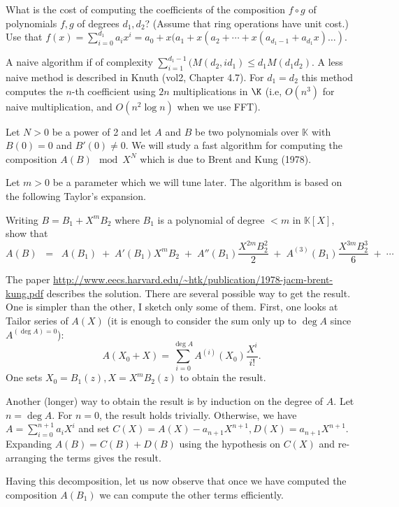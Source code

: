 \documentclass[11pt]{exam}
\theoremstyle{definition}
\newcommand{\field}{\mathbb{K}}
\begin{document}
\begin{questions}
	\question What is the cost of computing the coefficients of the composition $f\circ g$ of  polynomials $f,g$ of degrees $d_1, d_2$? (Assume that ring operations have unit cost.)
	Use that $f(x)=\sum_{i=0}^{d_1}a_ix^i=a_0+x(a_1+x(a_2+\cdots+x(a_{d_1-1}+a_{d_1} x)\ldots)$.


	\begin{solution}
		A naive algorithm if of complexity $\sum_{i=1}^{d_1-1}(M(d_2, id_1) \leq d_1 M(d_1 d_2)$.
		A less naive method is described in Knuth (vol2, Chapter 4.7). For $d_1=d_2$ this method computes the $n$-th coefficient using $2n$ multiplications in $\K$ (i.e, $O(n^3)$ for naive multiplication, and $O(n^2 \log n)$ when we use FFT).
	\end{solution}
	
	Let $N>0$ be a power of 2 and let
	$A$ and $B$ be two polynomials  
	over $\field$ with $B(0) = 0$ and $B'(0) \neq 0$.
	We will study a fast algorithm
	for computing the composition
	$A(B) \mod X^N$ which is due
	to Brent and Kung (1978).
	
	Let $m>0$ be a parameter which we will
	tune later. The algorithm is based on the following
	Taylor's expansion.
	
	\question
	Writing $B = B_1 + X^m B_2$ where $B_1$ is a polynomial
	of degree $<m$ in $\field[X]$, show that 
	\[A(B) \;\;=\;\; A(B_1) \;+\; A'(B_1) X^m B_2 \;+\; A''(B_1) \frac{X^{2m} B_2^2}{2} 
	\;+\; A^{(3)}(B_1) \frac{X^{3m} B_2^3}{6} \;+\; \cdots\]
	
	\begin{solution}
		The paper \url{http://www.eecs.harvard.edu/~htk/publication/1978-jacm-brent-kung.pdf} describes the solution.
		There are several possible way to get the result. One is simpler than the other, I sketch only some of them. First, one looks at Tailor series of $A(X)$ (it is enough to consider the sum only up to $\deg A$ since $A^{(\deg A) = 0}$): 
		\[
			A(X_0+X) = \sum_{i=0}^{\deg A} A^{(i)}(X_0) \frac{X^i}{i!}. 
		\]
		One sets $X_0 = B_1(z), X = X^m B_2(z)$ to obtain the result.
		
		Another (longer) way to obtain the result is by induction on the degree of $A$. Let $n = \deg A$. For $n=0$, the result holds trivially. Otherwise, we have $A = \sum_{i=0}^{n+1} a_i X^i$ and set $C(X) = A(X) - a_{n+1}X^{n+1}, D(X) = a_{n+1}X^{n+1}.$ Expanding $A(B) = C(B)+D(B)$ using the hypothesis on $C(X)$ and re-arranging the terms gives the result.
		
	\end{solution}
	Having this decomposition, let us now observe that once we have computed the 
	composition $A(B_1)$ we can compute the other terms efficiently.
	

\end{questions}
\end{document}
